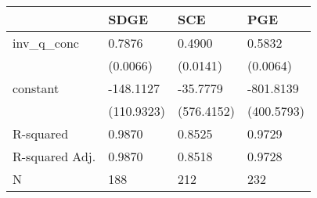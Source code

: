 \begin{tabular}{llll}
\hline
               & SDGE       & SCE        & PGE         \\
\hline
inv\_q\_conc   & 0.7876     & 0.4900     & 0.5832      \\
               & (0.0066)   & (0.0141)   & (0.0064)    \\
constant       & -148.1127  & -35.7779   & -801.8139   \\
               & (110.9323) & (576.4152) & (400.5793)  \\
R-squared      & 0.9870     & 0.8525     & 0.9729      \\
R-squared Adj. & 0.9870     & 0.8518     & 0.9728      \\
N              & 188        & 212        & 232         \\
\hline
\end{tabular}